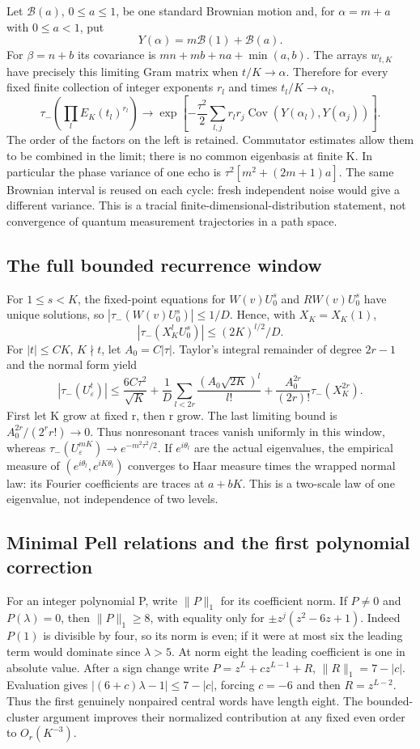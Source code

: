 Let $\mathcal B(a)$, $0\leq a\leq1$, be one standard Brownian motion and,
for $\alpha=m+a$ with $0\leq a<1$, put
\[
 Y(\alpha)=m\mathcal B(1)+\mathcal B(a).
\]
For $\beta=n+b$ its covariance is
$mn+mb+na+\min(a,b)$. The arrays $w_{t,K}$ have precisely this limiting
Gram matrix when $t/K\to\alpha$. Therefore for every fixed finite collection
of integer exponents $r_l$ and times $t_l/K\to\alpha_l$,
\[
 \tau_-\left(\prod_l E_K(t_l)^{r_l}\right)
 \longrightarrow
 \exp\left[-\frac{\tau^2}{2}\sum_{l,j}r_lr_j
                     \operatorname{Cov}(Y(\alpha_l),Y(\alpha_j))\right].
\]
The order of the factors on the left is retained. Commutator estimates allow
them to be combined in the limit; there is no common eigenbasis at finite K.
In particular the phase variance of one echo is
$\tau^2[m^2+(2m+1)a]$. The same Brownian interval is reused on each cycle:
fresh independent noise would give a different variance. This is a tracial
finite-dimensional-distribution statement, not convergence of quantum
measurement trajectories in a path space.

\subsection{The full bounded recurrence window}
For $1\leq s<K$, the fixed-point equations for $W(v)U_0^s$ and
$RW(v)U_0^s$ have unique solutions, so
$|\tau_-(W(v)U_0^s)|\leq1/D$. Hence, with $X_K=X_K(1)$,
\[
 |\tau_-(X_K^lU_0^s)|\leq(2K)^{l/2}/D.
\]
For $|t|\leq CK$, $K\nmid t$, let $A_0=C|\tau|$. Taylor's integral
remainder of degree $2r-1$ and the normal form yield
\[
 |\tau_-(U_\varepsilon^t)|
 \leq\frac{6C\tau^2}{\sqrt K}
 +\frac1D\sum_{l<2r}\frac{(A_0\sqrt{2K})^l}{l!}
 +\frac{A_0^{2r}}{(2r)!}\tau_-(X_K^{2r}).
\]
First let K grow at fixed r, then r grow. The last limiting bound is
$A_0^{2r}/(2^rr!)\to0$. Thus nonresonant traces vanish uniformly in this
window, whereas $\tau_-(U_\varepsilon^{mK})\to e^{-m^2\tau^2/2}$.
If $e^{i\theta_l}$ are the actual eigenvalues, the empirical measure of
$(e^{i\theta_l},e^{iK\theta_l})$ converges to Haar measure times the wrapped
normal law: its Fourier coefficients are traces at $a+bK$.
This is a two-scale law of one eigenvalue, not independence of two levels.

\subsection{Minimal Pell relations and the first polynomial correction}
For an integer polynomial P, write $\|P\|_1$ for its coefficient norm.
If $P\ne0$ and $P(\lambda)=0$, then $\|P\|_1\geq8$, with equality only for
$\pm z^j(z^2-6z+1)$. Indeed $P(1)$ is divisible by four, so its norm is even;
if it were at most six the leading term would dominate since $\lambda>5$.
At norm eight the leading coefficient is one in absolute value. After a sign
change write $P=z^L+c z^{L-1}+R$, $\|R\|_1=7-|c|$. Evaluation gives
$|(6+c)\lambda-1|\leq7-|c|$, forcing $c=-6$ and then
$R=z^{L-2}$. Thus the first genuinely nonpaired central words have length eight.
The bounded-cluster argument improves their normalized contribution at any
fixed even order to $O_r(K^{-3})$.

